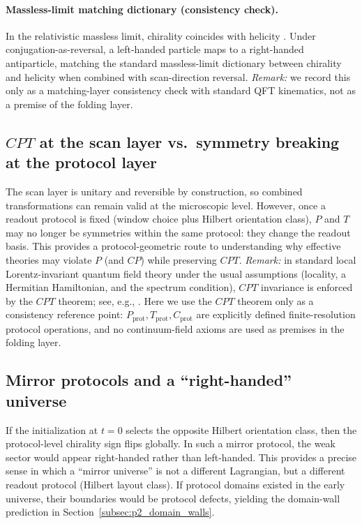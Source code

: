 \paragraph{Massless-limit matching dictionary (consistency check).}
In the relativistic massless limit, chirality coincides with helicity \cite{PeskinSchroeder1995,WeinbergQFT1995}.
Under conjugation-as-reversal, a left-handed particle maps to a right-handed antiparticle, matching the standard massless-limit dictionary between chirality and helicity when combined with scan-direction reversal.
\emph{Remark:} we record this only as a matching-layer consistency check with standard QFT kinematics, not as a premise of the folding layer.

\subsection{\texorpdfstring{$CPT$}{CPT} at the scan layer vs.\ symmetry breaking at the protocol layer}
\label{subsec:cpt_protocol}

The scan layer is unitary and reversible by construction, so combined transformations can remain valid at the microscopic level.
However, once a readout protocol is fixed (window choice plus Hilbert orientation class), $P$ and $T$ may no longer be symmetries within the same protocol: they change the readout basis.
This provides a protocol-geometric route to understanding why effective theories may violate $P$ (and $CP$) while preserving $CPT$.
\emph{Remark:} in standard local Lorentz-invariant quantum field theory under the usual assumptions (locality, a Hermitian Hamiltonian, and the spectrum condition), $CPT$ invariance is enforced by the $CPT$ theorem; see, e.g., \cite{StreaterWightman1989,WeinbergQFT1995}.
Here we use the $CPT$ theorem only as a consistency reference point: $P_{\mathrm{prot}},T_{\mathrm{prot}},C_{\mathrm{prot}}$ are explicitly defined finite-resolution protocol operations, and no continuum-field axioms are used as premises in the folding layer.

\subsection{Mirror protocols and a ``right-handed'' universe}
\label{subsec:mirror_universe}

If the initialization at $t=0$ selects the opposite Hilbert orientation class, then the protocol-level chirality sign flips globally.
In such a mirror protocol, the weak sector would appear right-handed rather than left-handed.
This provides a precise sense in which a ``mirror universe'' is not a different Lagrangian, but a different readout protocol (Hilbert layout class).
If protocol domains existed in the early universe, their boundaries would be protocol defects, yielding the domain-wall prediction in Section~\ref{subsec:p2_domain_walls}.


